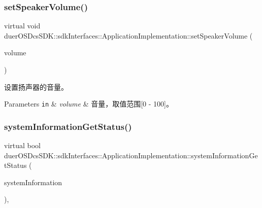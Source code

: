 \subsubsection{\texorpdfstring{set\+Speaker\+Volume()}{setSpeakerVolume()}}
{\footnotesize\ttfamily virtual void duer\+O\+S\+Dcs\+S\+D\+K\+::sdk\+Interfaces\+::\+Application\+Implementation\+::set\+Speaker\+Volume (\begin{DoxyParamCaption}\item[{int64\+\_\+t}]{volume }\end{DoxyParamCaption})\hspace{0.3cm}{\ttfamily [pure virtual]}}



设置扬声器的音量。 


\begin{DoxyParams}[1]{Parameters}
\mbox{\tt in}  & {\em volume} & 音量，取值范围\mbox{[}0 -\/ 100\mbox{]}。 \\
\hline
\end{DoxyParams}
\mbox{\label{classduerOSDcsSDK_1_1sdkInterfaces_1_1ApplicationImplementation_aab4fcea97b804159073abf54e25075bb}} 
\subsubsection{\texorpdfstring{system\+Information\+Get\+Status()}{systemInformationGetStatus()}}
{\footnotesize\ttfamily virtual bool duer\+O\+S\+Dcs\+S\+D\+K\+::sdk\+Interfaces\+::\+Application\+Implementation\+::system\+Information\+Get\+Status (\begin{DoxyParamCaption}\item[{\hyperlink{structduerOSDcsSDK_1_1sdkInterfaces_1_1SystemInformation}{System\+Information} \&}]{system\+Information }\end{DoxyParamCaption})\hspace{0.3cm}{\ttfamily [inline]}, {\ttfamily [virtual]}}



